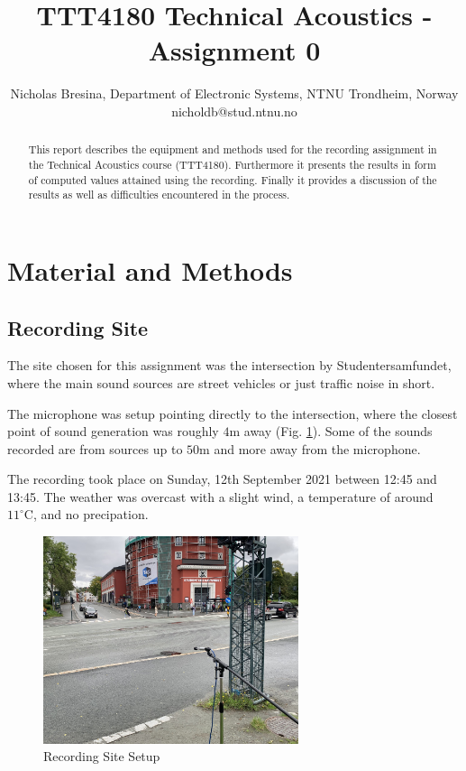 \documentclass[twocolumn]{article}
\begin{document}
\title{TTT4180 Technical Acoustics - Assignment 0}

\author{Nicholas Bresina, Department of Electronic Systems, NTNU Trondheim, Norway \\
nicholdb@stud.ntnu.no}

\maketitle\thispagestyle{empty}

\begin{abstract}
This report describes the equipment and methods used for the recording assignment in the Technical
Acoustics course (TTT4180).
Furthermore it presents the results in form of computed values attained using the recording.
Finally it provides a discussion of the results as well as difficulties encountered in the process.
\end{abstract}

\section{Material and Methods}
\subsection{Recording Site}
The site chosen for this assignment was the intersection by Studentersamfundet, where the main sound sources
are street vehicles or just traffic noise in short.

The microphone was setup pointing directly to the intersection, where the closest point of sound generation
was roughly $4\textrm{m}$ away (Fig. \ref{fig:recording_site_setup}).
Some of the sounds recorded are from sources up to $50\textrm{m}$ and more away from the microphone.

The recording took place on Sunday, 12th September 2021 between 12:45 and 13:45.
The weather was overcast with a slight wind, a temperature of around $11^\circ\textrm{C}$,
and no precipation.

\begin{figure}[H]
    \centering
    \includegraphics[width=75mm]{./Images/samfundet_recording_site.jpg}
    \caption{Recording Site Setup}
    \label{fig:recording_site_setup}
\end{figure}
\end{document}
